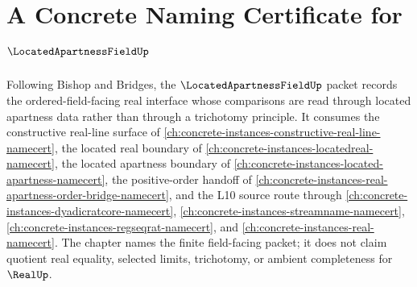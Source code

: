 \chapter{A Concrete Naming Certificate for $\LocatedApartnessFieldUp$}
\label{ch:concrete-instances-located-apartness-field-namecert}

Following Bishop and Bridges, the $\LocatedApartnessFieldUp$ packet records the ordered-field-facing real interface whose comparisons are read through located apartness data rather than through a trichotomy principle. It consumes the constructive real-line surface of \autoref{ch:concrete-instances-constructive-real-line-namecert}, the located real boundary of \autoref{ch:concrete-instances-locatedreal-namecert}, the located apartness boundary of \autoref{ch:concrete-instances-located-apartness-namecert}, the positive-order handoff of \autoref{ch:concrete-instances-real-apartness-order-bridge-namecert}, and the L10 source route through \autoref{ch:concrete-instances-dyadicratcore-namecert}, \autoref{ch:concrete-instances-streamname-namecert}, \autoref{ch:concrete-instances-regseqrat-namecert}, and \autoref{ch:concrete-instances-real-namecert}. The chapter names the finite field-facing packet; it does not claim quotient real equality, selected limits, trichotomy, or ambient completeness for $\RealUp$.

